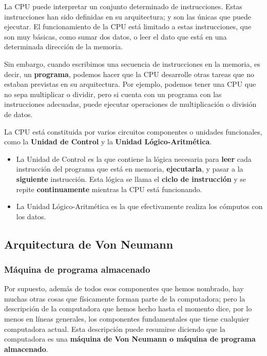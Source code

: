 \documentclass[spanish,a4paper,]{article}
\providecommand{\tightlist}{%
  \setlength{\itemsep}{0pt}\setlength{\parskip}{0pt}}
\begin{document}
La CPU puede interpretar un conjunto determinado de instrucciones. Estas
instrucciones han sido definidas en su arquitectura; y son las únicas
que puede ejecutar. El funcionamiento de la CPU está limitado a estas
instrucciones, que son muy básicas, como sumar dos datos, o leer el dato
que está en una determinada dirección de la memoria.

Sin embargo, cuando escribimos una secuencia de instrucciones en la
memoria, es decir, un \textbf{programa}, podemos hacer que la CPU
desarrolle otras tareas que no estaban previstas en su arquitectura. Por
ejemplo, podemos tener una CPU que no sepa multiplicar o dividir, pero
si cuenta con un programa con las instrucciones adecuadas, puede
ejecutar operaciones de multiplicación o división de datos.

La CPU está constituida por varios circuitos componentes o unidades
funcionales, como la \textbf{Unidad de Control} y la \textbf{Unidad
Lógico-Aritmética}.

\begin{itemize}
\tightlist
\item
  La Unidad de Control es la que contiene la lógica necesaria para
  \textbf{leer} cada instrucción del programa que está en memoria,
  \textbf{ejecutarla}, y pasar a la \textbf{siguiente} instrucción. Esta
  lógica se llama el \textbf{ciclo de instrucción} y se repite
  \textbf{continuamente} mientras la CPU está funcionando.
\item
  La Unidad Lógico-Aritmética es la que efectivamente realiza los
  cómputos con los datos.
\end{itemize}

\hypertarget{arquitectura-de-von-neumann}{%
\subsection{Arquitectura de Von
Neumann}\label{arquitectura-de-von-neumann}}

\hypertarget{muxe1quina-de-programa-almacenado}{%
\subsubsection{Máquina de programa
almacenado}\label{muxe1quina-de-programa-almacenado}}

Por supuesto, además de todos esos componentes que hemos nombrado, hay
muchas otras cosas que físicamente forman parte de la computadora; pero
la descripción de la computadora que hemos hecho hasta el momento dice,
por lo menos en líneas generales, los componentes fundamentales que
tiene cualquier computadora actual. Esta descripción puede resumirse
diciendo que la computadora es una \textbf{máquina de Von Neumann o
máquina de programa almacenado}.
\end{document}
